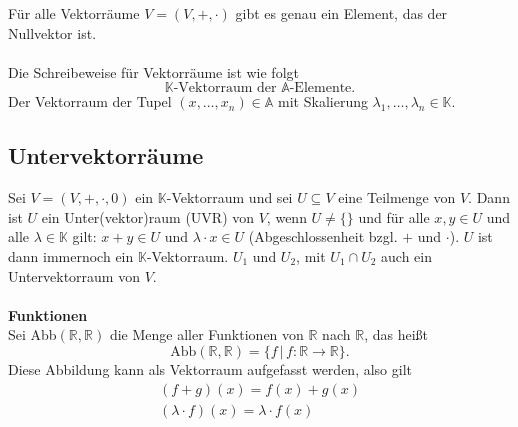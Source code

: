 \documentclass[a4paper,12pt]{article}
\numberwithin{equation}{section}
\begin{document}
Für alle Vektorräume $V=\left(V,+,\cdot \right)$ gibt es genau ein Element, das der Nullvektor ist.\\\\Die Schreibeweise für Vektorräume ist wie folgt
\[ 
        \mathbb{K}\text{-Vektorraum der $\mathbb{A}$-Elemente}
.\]Der Vektorraum der Tupel $\left(x,\hdots ,x_n\right) \in \mathbb{A}$ mit Skalierung $\lambda _1,\hdots ,\lambda _n  \in \mathbb{K}$. 

\subsection{Untervektorräume}
Sei $V=\left(V,+,\cdot ,0\right)$ ein $\mathbb{K}$-Vektorraum und sei $U\subseteq V$ eine Teilmenge von $V$. Dann ist $U$ ein Unter(vektor)raum (UVR) von $V$, wenn $U\neq \{\}$ und für alle $x,y \in U$ und alle $\lambda  \in \mathbb{K}$ gilt: $x+y \in U$ und $\lambda \cdot x \in U$ (Abgeschlossenheit bzgl. $+$ und $\cdot $). $U$ ist dann immernoch ein $\mathbb{K}$-Vektorraum. $U_1$ und $U_2$, mit $U_1\cap U_2$ auch ein Untervektorraum von $V$.
\\\hfill\\\textbf{Funktionen}\\ 
Sei Abb$\left(\mathbb{R},\mathbb{R}\right)$ die Menge aller Funktionen von $\mathbb{R}$ nach $\mathbb{R}$, das heißt
\[ 
        \text{Abb}\left(\mathbb{R},\mathbb{R}\right)=\{f\,|\, f:\mathbb{R}\rightarrow \mathbb{R}\}
.\] 
Diese Abbildung kann als Vektorraum aufgefasst werden, also gilt
\begin{gather*}
        \left(f+g\right)\left(x\right)=f\left(x\right)+g\left(x\right)\\
        \left(\lambda \cdot f\right)\left(x\right)=\lambda \cdot f\left(x\right)
\end{gather*}
\end{document}
